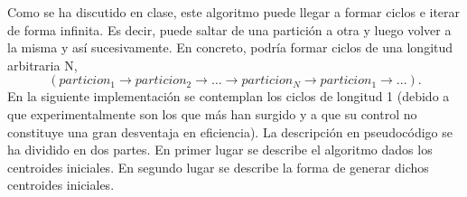 \documentclass[11pt,a4paper]{article}
\begin{document}
	Como se ha discutido en clase, este algoritmo puede llegar a formar ciclos e iterar de forma infinita. Es decir, puede saltar de una partición a otra y luego volver a la misma y así sucesivamente. En concreto, podría formar ciclos de una longitud arbitraria N,
	$$(particion_1 \longrightarrow particion_2 \longrightarrow ... \longrightarrow particion_N \longrightarrow particion_1 \longrightarrow ... ).$$
	En la siguiente implementación se contemplan los ciclos de longitud 1 (debido a que experimentalmente son los que más han surgido y a que su control no constituye una gran desventaja en eficiencia).
	La descripción en pseudocódigo se ha dividido en dos partes. En primer lugar se describe el algoritmo dados los centroides iniciales. En segundo lugar se describe la forma de generar dichos centroides iniciales. \\
	
\end{document}
